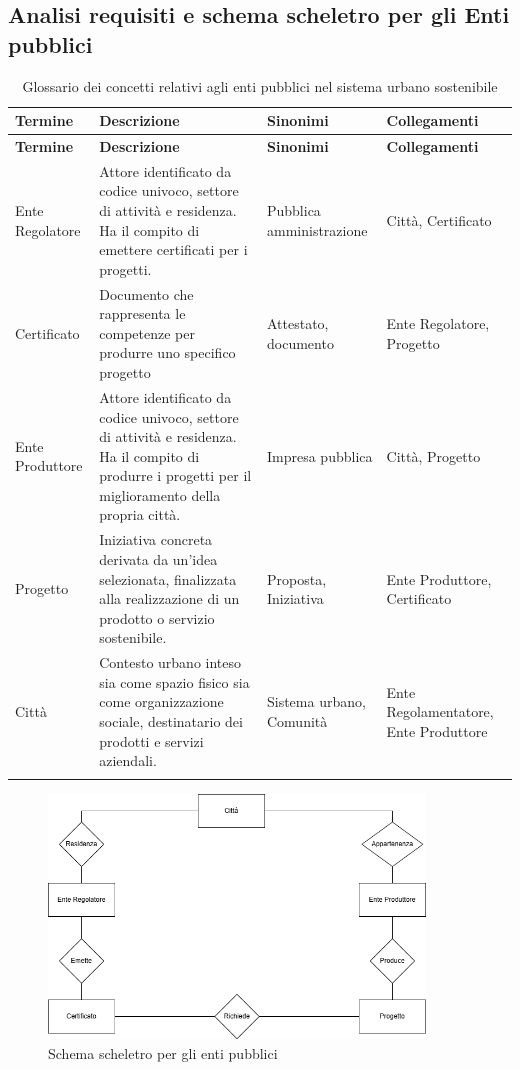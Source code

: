 \documentclass{article}
\begin{document}

\newpage
\subsection{Analisi requisiti e schema scheletro per gli Enti pubblici}

\begin{longtable}{|p{3cm}|p{6.5cm}|p{2.5cm}|p{3cm}|}
\hline
\textbf{Termine} & \textbf{Descrizione} & \textbf{Sinonimi} & \textbf{Collegamenti} \\
\hline
\endfirsthead

\hline
\textbf{Termine} & \textbf{Descrizione} & \textbf{Sinonimi} & \textbf{Collegamenti} \\
\hline
\endhead

Ente Regolatore & Attore identificato da codice univoco, settore di attività e residenza. Ha il compito di emettere certificati per i progetti. & Pubblica amministrazione & Città, Certificato \\
\hline

Certificato & Documento che rappresenta le competenze per produrre uno specifico progetto  & Attestato, documento & Ente Regolatore, Progetto \\
\hline

Ente Produttore & Attore identificato da codice univoco, settore di attività e residenza. Ha il compito di produrre i progetti per il miglioramento della propria città. & Impresa pubblica & Città, Progetto \\
\hline

Progetto & Iniziativa concreta derivata da un’idea selezionata, finalizzata alla realizzazione di un prodotto o servizio sostenibile. & Proposta, Iniziativa & Ente Produttore, Certificato \\
\hline

Città & Contesto urbano inteso sia come spazio fisico sia come organizzazione sociale, destinatario dei prodotti e servizi aziendali. & Sistema urbano, Comunità & Ente Regolamentatore, Ente Produttore \\
\hline

\caption{Glossario dei concetti relativi agli enti pubblici nel sistema urbano sostenibile}
\label{tab:glossario-enti}
\end{longtable}

\begin{figure}[H]
    \centering
    \includegraphics[width=10cm]{images/SchemaScheletroEnte.drawio}
    \caption{Schema scheletro per gli enti pubblici}
    \label{fig:schema-sostenibilita}
\end{figure}
\end{document}
